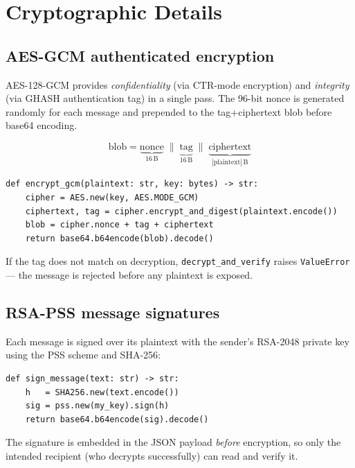 \documentclass[12pt,a4paper]{article}
\begin{document}
\section{Cryptographic Details}

\subsection{AES-GCM authenticated encryption}

AES-128-GCM provides \emph{confidentiality} (via CTR-mode encryption) and \emph{integrity} (via GHASH authentication tag) in a single pass.  The 96-bit nonce is generated randomly for each message and prepended to the tag+ciphertext blob before base64 encoding.

\[
  \text{blob} = \underbrace{\text{nonce}}_{16\,\text{B}} \;\|\;
                \underbrace{\text{tag}}_{16\,\text{B}} \;\|\;
                \underbrace{\text{ciphertext}}_{|\text{plaintext}|\,\text{B}}
\]

\begin{lstlisting}
def encrypt_gcm(plaintext: str, key: bytes) -> str:
    cipher = AES.new(key, AES.MODE_GCM)
    ciphertext, tag = cipher.encrypt_and_digest(plaintext.encode())
    blob = cipher.nonce + tag + ciphertext
    return base64.b64encode(blob).decode()
\end{lstlisting}

If the tag does not match on decryption, \texttt{decrypt\_and\_verify} raises \texttt{ValueError} --- the message is rejected before any plaintext is exposed.

\subsection{RSA-PSS message signatures}

Each message is signed over its plaintext with the sender's RSA-2048 private key using the PSS scheme and SHA-256:

\begin{lstlisting}
def sign_message(text: str) -> str:
    h   = SHA256.new(text.encode())
    sig = pss.new(my_key).sign(h)
    return base64.b64encode(sig).decode()
\end{lstlisting}

The signature is embedded in the JSON payload \emph{before} encryption, so only the intended recipient (who decrypts successfully) can read and verify it.
\end{document}

